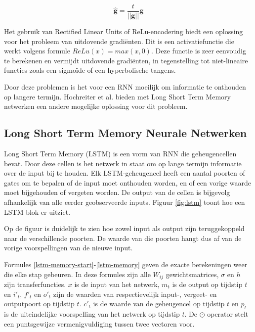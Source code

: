 \begin{equation}
    \mathbf{\hat{g}} = \frac{t}{||\mathbf{g}||}\mathbf{g}
\end{equation}

Het gebruik van Rectified Linear Units of ReLu-encodering biedt een oplossing voor het probleem van uitdovende gradi\"enten. Dit is een activatiefunctie die werkt volgens formule $ReLu(x) = max(x,0)$. Deze functie is zeer eenvoudig te berekenen en vermijdt uitdovende gradi\"enten, in tegenstelling tot niet-lineaire functies zoals een sigmo\"ide of een hyperbolische tangens\cite{Glorot2011}.

Door deze problemen is het voor een RNN moeilijk om informatie te onthouden op langere termijn. Hochreiter et al.\cite{SeppHochreiter1997} bieden met Long Short Term Memory netwerken een andere mogelijke oplossing voor dit probleem.

\subsection{Long Short Term Memory Neurale Netwerken}
\label{sub:lstm}
Long Short Term Memory (LSTM) is een vorm van RNN die geheugencellen bevat. Door deze cellen is het netwerk in staat om op lange termijn informatie over de input bij te houden. Elk LSTM-geheugencel heeft een aantal poorten of gates om te bepalen of de input moet onthouden worden, en of een vorige waarde moet bijgehouden of vergeten worden. De output van de cellen is bijgevolg afhankelijk van alle eerder geobserveerde inputs. Figuur \ref{fig:lstm} toont hoe een LSTM-blok er uitziet.\cite{SeppHochreiter1997,Google}

Op de figuur is duidelijk te zien hoe zowel input als output zijn teruggekoppeld naar de verschillende poorten. De waarde van die poorten hangt dus af van de vorige voorspellingen van de nieuwe input.

Formules \eqref{lstm-memory-start}-\eqref{lstm-memory} geven de exacte berekeningen weer die elke stap gebeuren. In deze formules zijn alle $W_{ij}$ gewichtsmatrices, $\sigma$ en $h$ zijn transferfuncties. $x$ is de input van het netwerk, $m_t$ is de output op tijdstip $t$ en $i'_t$, $f'_t$ en $o'_t$ zijn de waarden van respectievelijk input-, vergeet- en outputpoort op tijdstip $t$. $c'_t$ is de waarde van de geheugencel op tijdstip $t$ en $p_t$ is de uiteindelijke voorspelling van het netwerk op tijdstip $t$. De $\odot$ operator stelt een puntsgewijze vermenigvuldiging tussen twee vectoren voor.


